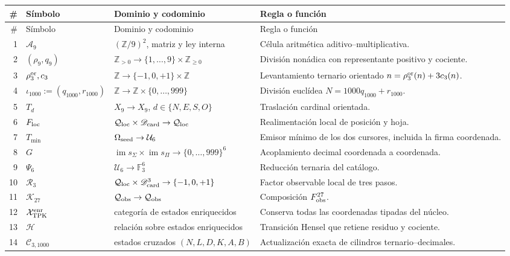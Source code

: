 \begingroup
\scriptsize
\renewcommand{\arraystretch}{1.12}
\begin{longtable}{@{}r p{}p{}p{}@{}}
\toprule
\#&Símbolo&Dominio y codominio&Regla o función\\
\midrule
\endfirsthead
\toprule
\#&Símbolo&Dominio y codominio&Regla o función\\
\midrule
\endhead
1&\(\mathcal A_9\)&\((\mathbb Z/9)^2\), matriz y ley interna&
Célula aritmética aditivo--multiplicativa.\\
2&\((\rho_9,q_9)\)&\(\mathbb Z_{>0}\to
\{1,\ldots,9\}\times\mathbb Z_{\geq0}\)&
División nonádica con representante positivo y cociente.\\
3&\(\rho_3^{\rm or},c_3\)&\(\mathbb Z\to
\{-1,0,+1\}\times\mathbb Z\)&
Levantamiento ternario orientado \(n=\rho_3^{\rm or}(n)+3c_3(n)\).\\
4&\(\iota_{1000}:=(q_{1000},r_{1000})\)&\(\mathbb Z\to
\mathbb Z\times\{0,\ldots,999\}\)&
División euclídea \(N=1000q_{1000}+r_{1000}\).\\
5&\(T_d\)&\(X_9\to X_9\), \(d\in\{N,E,S,O\}\)&
Traslación cardinal orientada.\\
6&\(F_{\rm loc}\)&\(\mathcal Q_{\rm loc}\times
\mathscr D_{\rm card}\to\mathcal Q_{\rm loc}\)&
Realimentación local de posición y hoja.\\
7&\(T_{\min}\)&\(\Omega_{\rm seed}\to\mathcal U_6\)&
Emisor mínimo de los dos cursores, incluida la firma coordenada.\\
8&\(G\)&\(\operatorname{im}s_\Sigma\times
\operatorname{im}s_\Pi\to\{0,\ldots,999\}^6\)&
Acoplamiento decimal coordenada a coordenada.\\
9&\(\Psi_6\)&\(\mathcal U_6\to\mathbb F_3^6\)&
Reducción ternaria del catálogo.\\
10&\(\mathcal R_3\)&\(\mathcal Q_{\rm loc}\times
\mathscr D_{\rm card}^3\to\{-1,0,+1\}\)&
Factor observable local de tres pasos.\\
11&\(\mathcal K_{27}\)&\(\mathcal Q_{\rm obs}\to\mathcal Q_{\rm obs}\)&
Composición \(F_{\rm obs}^{27}\).\\
12&\(\mathcal X_{\rm TPK}^{\rm enr}\)&categoría de estados enriquecidos&
Conserva todas las coordenadas tipadas del núcleo.\\
13&\(\mathcal H\)&relación sobre estados enriquecidos&
Transición Hensel que retiene residuo y cociente.\\
14&\(\mathcal C_{3,1000}\)&estados cruzados
\((N,L,D,K,A,B)\)&
Actualización exacta de cilindros ternario--decimales.\\

\end{longtable}
